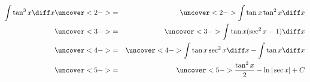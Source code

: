 \begin{frame}
\begin{example}[Example 7, p. 500]
\begin{eqnarray*}
\int \tan^3 x \diff x%
 & \uncover<2->{ = } & %
\uncover<2->{\int \tan x \tan^2 x \diff x}\\%
 & \uncover<3->{ = } & %
\uncover<3->{\int \tan x (\sec^2 x - 1)\diff x}\\%
 & \uncover<4->{ = } & %
\uncover<4->{\int \tan x \sec^2 x \diff x - \int \tan x \diff x}\\%
 & \uncover<5->{ = } & %
\uncover<5->{\frac{\tan^2 x}{2}  -  \ln|\sec x|  + C}\\%
\end{eqnarray*}
\end{example}
\end{frame}
